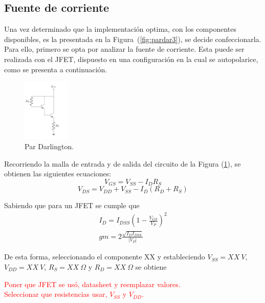 \subsection{Fuente de corriente}
\label{subsec:fdei}
Una vez determinado que la implementación optima, con los componentes disponibles, es la presentada en la Figura~(\ref{fig:pardar3}), se decide confeccionarla. Para ello, primero se opta por analizar la fuente de corriente. Esta puede ser realizada con el JFET, dispuesto en una configuración en la cual se autopolarice, como se presenta a continuación.
\begin{figure}[H]
\centering
	\includegraphics[width=0.2\textwidth, page=4]{Imagenes/ParDarlington.pdf}
	\caption{Par Darlington.}
	\label{fig:fuentei}
\end{figure}

Recorriendo la malla de entrada y de salida del circuito de la Figura (\ref{fig:fuentei}), se obtienen las siguientes ecuaciones:
\begin{equation}
	V_{GS} = V_{SS} - I_{D} R_{S}
\end{equation}
\begin{equation}
	V_{DS} = V_{DD} + V_{SS} - I_{D} \left( R_{D} + R_{S} \right)
\end{equation}

Sabiendo que para un JFET se cumple que
\begin{equation}
\begin{split}
	I_D = I_{DSS} \left( 1- \frac{V_{GS}}{V_P} \right)^2 \\
	gm = 2\frac{\sqrt{I_D I_{DSS}}}{|V_P|}
\end{split}
\end{equation}

De esta forma, seleccionando el componente XX %
y estableciendo $V_{SS} = XX \ V$, $V_{DD} = XX \ V$, $R_S = XX \ \Omega$ y $R_D = XX \ \Omega$ se obtiene
\begin{center}
	\LARGE{\textcolor{red}{Poner que JFET se usó, datasheet y reemplazar valores.}} \\
	\LARGE{\textcolor{red}{Seleccionar que resistencias usar, $V_{SS}$ y $V_{DD}$.}}
\end{center}

